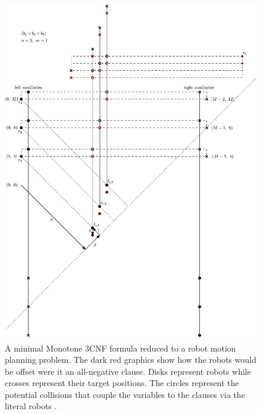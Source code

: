 \begin{figure}[h]
	\centering
	\includegraphics[height=15cm]{ipe/minimal_ex.eps}
	\caption{A minimal Monotone 3CNF formula  reduced to a robot motion planning problem. The dark red graphics show how the robots would be offset were it an all-negative clause. Disks represent robots while crosses represent their target positions. The circles represent the potential collisions that couple the variables  to the clauses  via the literal robots .}\label{fig:reachability}
\end{figure}
